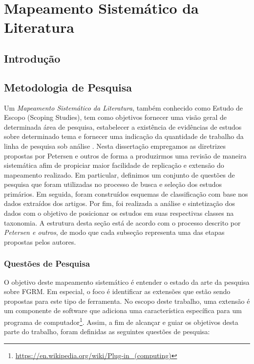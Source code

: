 \chapter{Mapeamento Sistemático da Literatura}
\label{ch:mapeamento-sistematico}

\section{Introdução}
\label{sec:map-intro}

\section{Metodologia de Pesquisa}
\label{sec:map-metodologia}

Um \textit{Mapeamento Sistemático da Literatura}, também conhecido como Estudo de Escopo (Scoping
Studies), tem como objetivos fornecer uma visão geral de determinada área de pesquisa, estabelecer a
existência de evidências de estudos sobre determinado tema e fornecer uma indicação da quantidade de
trabalho da linha de pesquisa sob análise \cite{keele2007guidelines,wohlin2012experimentation}.
Nesta dissertação empregamos as diretrizes propostas por Petersen e outros \cite{Petersen2008} de
forma a produzirmos uma revisão de maneira sistemática afim de propiciar maior facilidade de
replicação e extensão do mapeamento realizado. Em particular, definimos um conjunto de questões de
pesquisa que foram utilizadas no processo de busca e seleção dos estudos primários. Em seguida,
foram construídos esquemas de classificação com base nos dados extraídos  dos artigos. Por fim, foi
realizada a análise e sintetização dos dados com o objetivo de posicionar os estudos em suas
respectivas classes na taxonomia. A estrutura desta seção está de acordo com o processo descrito 
por \textit{Petersen e outros}, de modo que cada subseção representa uma das etapas propostas pelos autores.

\subsection{Questões de Pesquisa}
\label{subsec:map-questoes-de-pesquisa}

O objetivo deste mapeamento sistemático é entender o estado da arte da pesquisa sobre FGRM. Em especial, o foco é identificar as extensões que estão sendo propostas para este tipo de ferramenta. No escopo deste trabalho, uma extensão é um componente de software que adiciona uma característica específica para um programa de computador\footnote{\url{https://en.wikipedia.org/wiki/Plug-in_(computing)}}. Assim, a fim de alcançar e guiar os objetivos desta parte do trabalho, foram definidas as seguintes questões de pesquisa:

